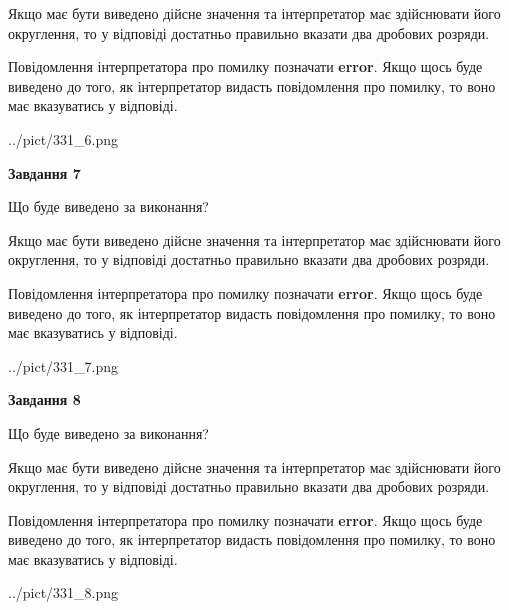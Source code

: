 \documentclass[12pt, ukrainian]{article}
\begin{document}
{\begin {Large}
Якщо має бути виведено дійсне значення та інтерпретатор має здійснювати його округлення, 
то у відповіді достатньо правильно вказати два дробових розряди.

Повідомлення інтерпретатора про помилку позначати \textbf{error}.
Якщо щось буде виведено до того, як інтерпретатор видасть повідомлення про помилку, 
то воно має вказуватись у відповіді. \par

\begin{center}
	{../pict/331_6.png}
\end{center}
\newpage

{\begin {center}\textbf{Завдання 7}\end {center}}\par
Що буде виведено за виконання? \par

Якщо має бути виведено дійсне значення та інтерпретатор має здійснювати його округлення, 
то у відповіді достатньо правильно вказати два дробових розряди.

Повідомлення інтерпретатора про помилку позначати \textbf{error}.
Якщо щось буде виведено до того, як інтерпретатор видасть повідомлення про помилку, 
то воно має вказуватись у відповіді. \par

\begin{center}
	{../pict/331_7.png}
\end{center}
\newpage

{\begin {center}\textbf{Завдання 8}\end {center}}\par
Що буде виведено за виконання? \par

Якщо має бути виведено дійсне значення та інтерпретатор має здійснювати його округлення, 
то у відповіді достатньо правильно вказати два дробових розряди.

Повідомлення інтерпретатора про помилку позначати \textbf{error}.
Якщо щось буде виведено до того, як інтерпретатор видасть повідомлення про помилку, 
то воно має вказуватись у відповіді. \par

\begin{center}
	{../pict/331_8.png}
\end{center}
\newpage


\end{Large}}
\end{document}
